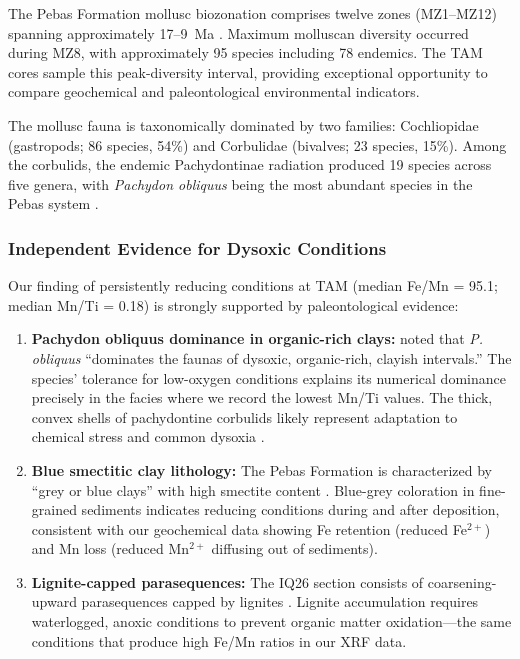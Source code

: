 The Pebas Formation mollusc biozonation comprises twelve zones (MZ1--MZ12) spanning approximately 17--9~Ma \citep{Wesselingh2006b}. Maximum molluscan diversity occurred during MZ8, with approximately 95 species including 78 endemics. The TAM cores sample this peak-diversity interval, providing exceptional opportunity to compare geochemical and paleontological environmental indicators.

The mollusc fauna is taxonomically dominated by two families: Cochliopidae (gastropods; 86 species, 54\%) and Corbulidae (bivalves; 23 species, 15\%). Among the corbulids, the endemic Pachydontinae radiation produced 19 species across five genera, with \textit{Pachydon obliquus} being the most abundant species in the Pebas system \citep{Wesselingh2006a}.

\subsubsection{Independent Evidence for Dysoxic Conditions}

Our finding of persistently reducing conditions at TAM (median Fe/Mn = 95.1; median Mn/Ti = 0.18) is strongly supported by paleontological evidence:

\begin{enumerate}
\item \textbf{Pachydon obliquus dominance in organic-rich clays:} \citet{Wesselingh2006a} noted that \textit{P. obliquus} ``dominates the faunas of dysoxic, organic-rich, clayish intervals.'' The species' tolerance for low-oxygen conditions explains its numerical dominance precisely in the facies where we record the lowest Mn/Ti values. The thick, convex shells of pachydontine corbulids likely represent adaptation to chemical stress and common dysoxia \citep{Wesselingh2006a}.

\item \textbf{Blue smectitic clay lithology:} The Pebas Formation is characterized by ``grey or blue clays'' with high smectite content \citep{Wesselingh2002, Hoorn2010}. Blue-grey coloration in fine-grained sediments indicates reducing conditions during and after deposition, consistent with our geochemical data showing Fe retention (reduced Fe$^{2+}$) and Mn loss (reduced Mn$^{2+}$ diffusing out of sediments).

\item \textbf{Lignite-capped parasequences:} The IQ26 section consists of coarsening-upward parasequences capped by lignites \citep{Wesselingh2002}. Lignite accumulation requires waterlogged, anoxic conditions to prevent organic matter oxidation---the same conditions that produce high Fe/Mn ratios in our XRF data.
\end{enumerate}


